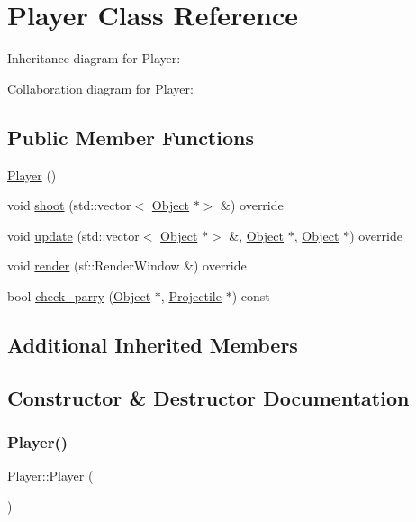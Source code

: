 \hypertarget{classPlayer}{}\section{Player Class Reference}
\label{classPlayer}


Inheritance diagram for Player\+:


Collaboration diagram for Player\+:
\subsection*{Public Member Functions}
\begin{DoxyCompactItemize}
\item 
\hyperlink{classPlayer_affe0cc3cb714f6deb4e62f0c0d3f1fd8}{Player} ()
\item 
void \hyperlink{classPlayer_ac5b2ef483a7f16279891263b4888e1b8}{shoot} (std\+::vector$<$ \hyperlink{classObject}{Object} $\ast$$>$ \&) override
\item 
void \hyperlink{classPlayer_a3e780fb5594be0bccbdf363f919a36d7}{update} (std\+::vector$<$ \hyperlink{classObject}{Object} $\ast$$>$ \&, \hyperlink{classObject}{Object} $\ast$, \hyperlink{classObject}{Object} $\ast$) override
\item 
void \hyperlink{classPlayer_a320917a017d1d621b7413585ab017f14}{render} (sf\+::\+Render\+Window \&) override
\item 
bool \hyperlink{classPlayer_a67a9e13790be1571986474106051dbe7}{check\+\_\+parry} (\hyperlink{classObject}{Object} $\ast$, \hyperlink{classProjectile}{Projectile} $\ast$) const
\end{DoxyCompactItemize}
\subsection*{Additional Inherited Members}


\subsection{Constructor \& Destructor Documentation}
\mbox{\label{classPlayer_affe0cc3cb714f6deb4e62f0c0d3f1fd8}} 
\subsubsection{\texorpdfstring{Player()}{Player()}}
{\footnotesize\ttfamily Player\+::\+Player (\begin{DoxyParamCaption}{ }\end{DoxyParamCaption})}

